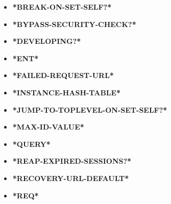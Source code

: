 \documentclass [11pt]{book}
\begin{document}
\begin{itemize}

\item {}
\textbf{*BREAK-ON-SET-SELF?*}





\item {}
\textbf{*BYPASS-SECURITY-CHECK?*}





\item {}
\textbf{*DEVELOPING?*}





\item {}
\textbf{*ENT*}





\item {}
\textbf{*FAILED-REQUEST-URL*}





\item {}
\textbf{*INSTANCE-HASH-TABLE*}





\item {}
\textbf{*JUMP-TO-TOPLEVEL-ON-SET-SELF?*}





\item {}
\textbf{*MAX-ID-VALUE*}





\item {}
\textbf{*QUERY*}





\item {}
\textbf{*REAP-EXPIRED-SESSIONS?*}





\item {}
\textbf{*RECOVERY-URL-DEFAULT*}





\item {}
\textbf{*REQ*}





\end{itemize}
\end{document}
